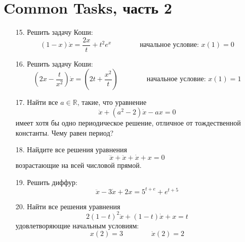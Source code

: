 \documentclass[a4paper,12pt]{article}
\newcommand{\R}{\mathbb{R}}
\newcommand{\dx}{\dot{x}}
\newcommand{\ddx}{\ddot{x}}
\newcommand{\dddx}{\dddot{x}}
\begin{document}
\newpage
\section{Common Tasks, часть 2}

\begin{enumerate}
	\item[15.] Решить задачу Коши:
	\[(1 - x)\dx = \dfrac{2x}{t} + t^2e^x\qquad\qquad\text{начальное условие: }x(1) = 0\]
	\item[16.] Решить задачу Коши:
	\[\left(2x - \dfrac{t}{x^2}\right)\dx = \left(2t + \dfrac{x^2}{t}\right)\qquad\qquad\text{начальное условие: }x(1) = 1\]
	\item[17.] Найти все $a \in \R$, такие, что уравнение
	\[\ddx + (a^2 - 2)\dx - ax = 0\]имеет хотя бы одно периодическое решение, отличное от тождественной константы. Чему равен период?
	\item[18.] Найдите все решения уравнения 
	\[\dddx + \ddx + \dx + x = 0\]возрастающие на всей числовой прямой.
	\item[19.] Решить диффур:
	\[\ddx - 3\dx + 2x = 5^{t + e} + e^{t + 5}\]
	\item[20.] Найти все решения уравнения
	\[2(1 - t)^2\ddx + (1 - t)\dx + x = t\]
	удовлетворяющие начальным условиям:
	\[x(2) = 3 \qquad \qquad \dx(2) = 2\]
\end{enumerate}
\end{document}
